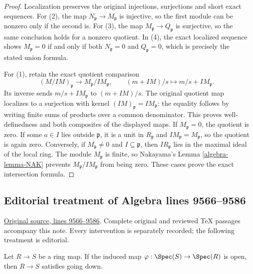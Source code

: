 \begin{proof}
Localization preserves the original injections, surjections
and short exact sequences. For (2), the map
$N_{\mathfrak p}\to M_{\mathfrak p}$ is injective, so
the first module can be nonzero only if the second is.
For (3), the map $M_{\mathfrak p}\to Q_{\mathfrak p}$
is surjective, so the same conclusion holds for a nonzero
quotient. In (4), the exact localized sequence shows
$M_{\mathfrak p}=0$ if and only if both
$N_{\mathfrak p}=0$ and $Q_{\mathfrak p}=0$, which is
precisely the stated union formula.

For (1), retain the exact quotient comparison
$$
(M/IM)_{\mathfrak p}\longrightarrow M_{\mathfrak p}/IM_{\mathfrak p},
\qquad (m+IM)/s\longmapsto m/s+IM_{\mathfrak p}.
$$
Its inverse sends $m/s+IM_{\mathfrak p}$ to $(m+IM)/s$.
The original quotient map localizes to a surjection with
kernel $(IM)_{\mathfrak p}=IM_{\mathfrak p}$: the equality
follows by writing finite sums of products over a common
denominator. This proves well-definedness and both
composites of the displayed maps. If $M_{\mathfrak p}=0$,
the quotient is zero. If some $a\in I$ lies outside
$\mathfrak p$, it is a unit in $R_{\mathfrak p}$ and
$IM_{\mathfrak p}=M_{\mathfrak p}$, so the quotient is
again zero. Conversely, if $M_{\mathfrak p}\ne0$ and
$I\subseteq\mathfrak p$, then $IR_{\mathfrak p}$ lies
in the maximal ideal of the local ring. The module
$M_{\mathfrak p}$ is finite, so Nakayama's
Lemma \ref{algebra-lemma-NAK} prevents
$M_{\mathfrak p}/IM_{\mathfrak p}$ from being zero.
These cases prove the exact intersection formula.
\end{proof}


\subsection{Editorial treatment of Algebra lines 9566--9586}

\hypertarget{algebra-context-105}{}

\noindent\href{https://github.com/stacks/stacks-project/blob/a04446e57ec1fbc252a871afcec7752fb2807b14/algebra.tex\#L9566}{Original source, lines 9566--9586}. Complete original and reviewed TeX passages accompany this note. Every intervention is separately recorded; the following treatment is editorial.


\begin{lemma}
\label{editorial-source-lemma-open-going-down}
Let $R \to S$ be a ring map. If the induced map
$\varphi : \Spec(S) \to \Spec(R)$ is open, then
$R \to S$ satisfies going down.
\end{lemma}


